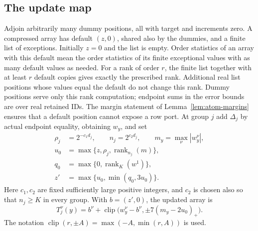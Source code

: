 \subsection{The update map}

Adjoin arbitrarily many dummy positions, all with target and increments
zero.  A compressed array has default $(z,0)$, shared also by the dummies,
and a finite list of exceptions.  Initially $z=0$ and the list is empty.
Order statistics of an array with this default mean the order statistics
of its finite exceptional values with as many default values as needed.
For a rank of order $r$, the finite list together with at least $r$
default copies gives exactly the prescribed rank.  Additional real list
positions whose values equal the default do not change this rank.
Dummy positions serve only this rank computation; endpoint sums in the
error bounds are over real retained IDs.  The margin statement of
Lemma~\ref{lem:atom-margins} ensures that a default position cannot expose
a row port.
At group $j$ add $\Delta_j$ by actual endpoint equality, obtaining $w_y$,
and set
\begin{equation}
 \begin{aligned}
 \rho_j&=2^{-c_1d_j},\qquad n_j=2^{c_2d_j},\qquad
 m_y=\max_\nu|w_y^\nu|,\\
 u_0&=\max\{z,\rho_j,\operatorname{rank}_{n_j}(m)\},\\
 q_0&=\max\{0,\operatorname{rank}_K(w^1)\},\\
 z'&=\max\{u_0,\min(q_0,3u_0)\}.
 \end{aligned}
 \label{eq:buf-thresholds}
\end{equation}
Here $c_1,c_2$ are fixed sufficiently large positive integers, and
$c_2$ is chosen also so that $n_j\geq K$ in every group.
With $b=(z',0)$, the updated array is
\begin{equation}
 T_j^\nu(y)=b^\nu+
 \operatorname{clip}\bigl(w_y^\nu-b^\nu,
                \pm7(m_y-2u_0)_+\bigr).
 \label{eq:buf-update}
\end{equation}
The notation $\operatorname{clip}(r,\pm A)=\max(-A,\min(r,A))$ is used.

